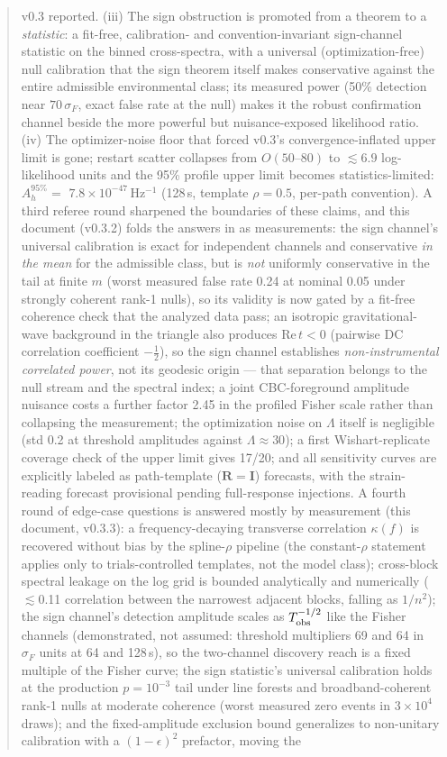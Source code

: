 \documentclass[11pt]{article}
\newcommand{\Ah}{A_h}
\begin{document}
\begin{abstract}
v0.3 reported. (iii) The sign obstruction is promoted from a theorem to a \emph{statistic}: a fit-free, calibration- and convention-invariant sign-channel statistic on the binned cross-spectra, with a universal (optimization-free) null calibration that the sign theorem itself makes conservative against the entire admissible environmental class; its measured power (50\% detection near $70\,\sigma_F$, exact false rate at the null) makes it the robust confirmation channel beside the more powerful but nuisance-exposed likelihood ratio. (iv) The optimizer-noise floor that forced v0.3's convergence-inflated upper limit is gone; restart scatter collapses from $O(50\text{--}80)$ to $\lesssim 6.9$ log-likelihood units and the 95\% profile upper limit becomes statistics-limited: $\Ah^{95\%} = $ $7.8\times10^{-47}$$\,\mathrm{Hz^{-1}}$ (128\,s, template $\rho = 0.5$, per-path convention). A third referee round sharpened the boundaries of these claims, and this document (v0.3.2) folds the answers in as measurements: the sign channel's universal calibration is exact for independent channels and conservative \emph{in the mean} for the admissible class, but is \emph{not} uniformly conservative in the tail at finite $m$ (worst measured false rate 0.24 at nominal 0.05 under strongly coherent rank-1 nulls), so its validity is now gated by a fit-free coherence check that the analyzed data pass; an isotropic gravitational-wave background in the triangle also produces $\mathrm{Re}\,t<0$ (pairwise DC correlation coefficient $-\tfrac12$), so the sign channel establishes \emph{non-instrumental correlated power}, not its geodesic origin --- that separation belongs to the null stream and the spectral index; a joint CBC-foreground amplitude nuisance costs a further factor 2.45 in the profiled Fisher scale rather than collapsing the measurement; the optimization noise on $\Lambda$ itself is negligible (std 0.2 at threshold amplitudes against $\Lambda \approx 30$); a first Wishart-replicate coverage check of the upper limit gives 17/20; and all sensitivity curves are explicitly labeled as path-template ($\mathbf{R}=\mathbf{I}$) forecasts, with the strain-reading forecast provisional pending full-response injections. A fourth round of edge-case questions is answered mostly by measurement (this document, v0.3.3): a frequency-decaying transverse correlation $\kappa(f)$ is recovered without bias by the spline-$\rho$ pipeline (the constant-$\rho$ statement applies only to trials-controlled templates, not the model class); cross-block spectral leakage on the log grid is bounded analytically and numerically ($\lesssim$0.11 correlation between the narrowest adjacent blocks, falling as $1/n^2$); the sign channel's detection amplitude scales as $T_{\rm obs}^{-1/2}$ like the Fisher channels (demonstrated, not assumed: threshold multipliers 69 and 64 in $\sigma_F$ units at 64 and 128\,s), so the two-channel discovery reach is a fixed multiple of the Fisher curve; the sign statistic's universal calibration holds at the production $p = 10^{-3}$ tail under line forests and broadband-coherent rank-1 nulls at moderate coherence (worst measured zero events in $3\times10^4$ draws); and the fixed-amplitude exclusion bound generalizes to non-unitary calibration with a $(1-\epsilon)^{2}$ prefactor, moving the 
\end{abstract}
\end{document}
